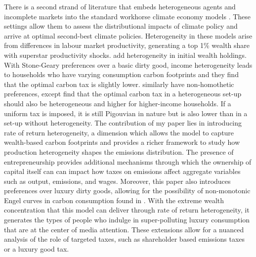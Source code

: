 \documentclass[12pt,a4paper]{article}
\begin{document}
\hspace*{6mm} There is a second strand of literature that embeds heterogeneous agents and incomplete markets into the standard workhorse climate economy models \citep{golosov2014optimal, nordhaus2003warming}. These settings allow them to assess the distributional impacts of climate policy and arrive at optimal second-best climate policies. Heterogeneity in these models arise from differences in labour market productivity, generating a top 1\% wealth share with superstar productivity shocks. \cite{douenne2023optimal} add heterogeneity in initial wealth holdings. With Stone-Geary preferences over a basic dirty good, income heterogeneity leads to households who have varying consumption carbon footprints and they find that the optimal carbon tax is slightly lower. \cite{belfiori2024unequal} similarly have non-homothetic preferences, except find that the optimal carbon tax in a heterogeneous set-up should also be heterogeneous and higher for higher-income households. If a uniform tax is imposed, it is still Pigouvian in nature but is also lower than in a set-up without heterogeneity. The contribution of my paper lies in introducing rate of return heterogeneity, a dimension which allows the model to capture wealth-based carbon footprints and provides a richer framework to study how production heterogeneity shapes the emissions distribution. The presence of entrepreneurship provides additional mechanisms through which  the ownership of capital itself can can impact how taxes on emissions affect aggregate variables such as  output, emissions, and wages.  Moreover, this paper also introduces preferences over luxury dirty goods, allowing for the possibility of non-monotonic Engel curves in carbon consumption found in \cite{starr2023assessing}. With the extreme wealth concentration that this model can deliver through rate of return heterogeneity, it generates the types of people who indulge in super-polluting luxury consumption that are at the center of media attention. These extensions allow for a nuanced analysis of the role of targeted taxes, such as shareholder based emissions taxes or a luxury good tax. 
\end{document}
